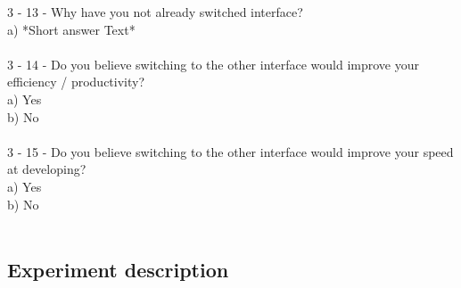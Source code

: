 \documentclass[]{report}
\begin{document}
	3 - 13 - Why have you not already switched interface?\\
	a) *Short answer Text*\\\\
	3 - 14 - Do you believe switching to the other interface would improve your efficiency / productivity?\\
	a) Yes\\
	b) No\\\\
	3 - 15 - Do you believe switching to the other interface would improve your speed at developing?\\
	a) Yes\\
	b) No\\\\
	
	\subsection{Experiment description}
	\label{appendix: Experiment description}
	
\end{document}
